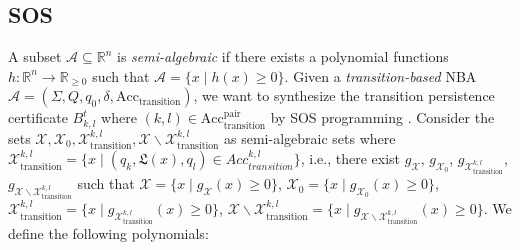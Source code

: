 \documentclass[acmlarge]{acmart}
\begin{document}
\subsection{SOS}
A subset $\mathcal{A} \subseteq \mathbb{R}^n$ is \textit{semi-algebraic} if there exists a polynomial functions $h:\mathbb{R}^n \rightarrow \mathbb{R}_{\geq 0}$ such that $\mathcal{A} = \{x \mid h(x) \geq 0\}$. Given a \emph{transition-based} NBA $\mathcal{A} = (\Sigma, Q, q_0, \delta, \text{Acc}_{\text{transition}})$, we want to synthesize the transition persistence certificate $B^t_{k, l}$ where $(k, l) \in \text{Acc}_{\text{transition}}^{\text{pair}}$ by SOS programming \cite{parrilo2003semidefinite}. Consider the sets $\mathcal{X}, \mathcal{X}_{0}, \mathcal{X}_{\text{transition}}^{k, l}, \mathcal{X} \backslash \mathcal{X}_{\text{transition}}^{k, l}$ as semi-algebraic sets where $\mathcal{X}_{\text{transition}}^{k, l} = \{x \mid (q_k, \mathfrak{L}(x), q_l) \in Acc_{transition}^{k, l}\}$, i.e.,
there exist $g_{\mathcal{X}}$, $g_{\mathcal{X}_0}$, $g_{\mathcal{X}_{\text{transition}}^{k, l}}$, $g_{\mathcal{X} \backslash \mathcal{X}_{\text{transition}}^{k, l}}$ such that $\mathcal{X} = \{x \mid g_{\mathcal{X}}(x) \geq 0\}$, $\mathcal{X}_{0} = \{x \mid g_{\mathcal{X}_0}(x) \geq 0\}$, $\mathcal{X}_{\text{transition}}^{k,l} = \{x \mid g_{\mathcal{X}_{\text{transition}}^{k,l}}(x) \geq 0\}$, $\mathcal{X} \backslash \mathcal{X}_{\text{transition}}^{k,l} = \{x \mid g_{\mathcal{X} \backslash \mathcal{X}_{\text{transition}}^{k,l}}(x) \geq 0\}$. We define the following polynomials:
\end{document}
